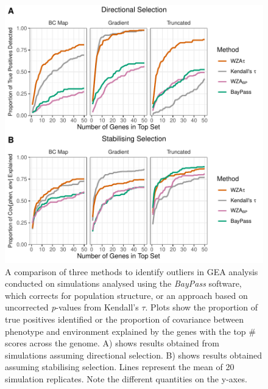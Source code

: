 \documentclass[10pt,twoside,lineno]{GSA_format}
\begin{document}
\begin{figure}
  \includegraphics[width=\linewidth]{Plots/UncorrectedBayPassComparison_TruePositives.pdf} 
  \caption{A comparison of three methods to identify outliers in GEA analysis conducted on simulations analysed using the \textit{BayPass} software, which corrects for population structure, or an approach based on uncorrected \textit{p}-values from Kendall's $\tau$. Plots show the proportion of true positives identified or the proportion of covariance between phenotype and environment explained by the genes with the top \# scores across the genome. A) shows results obtained from simulations assuming directional selection. B) shows results obtained assuming stabilising selection. Lines represent the mean of 20 simulation replicates. Note the different quantities on the y-axes.}

  \label{fig:truePosBoth}
\end{figure}
\end{document}
